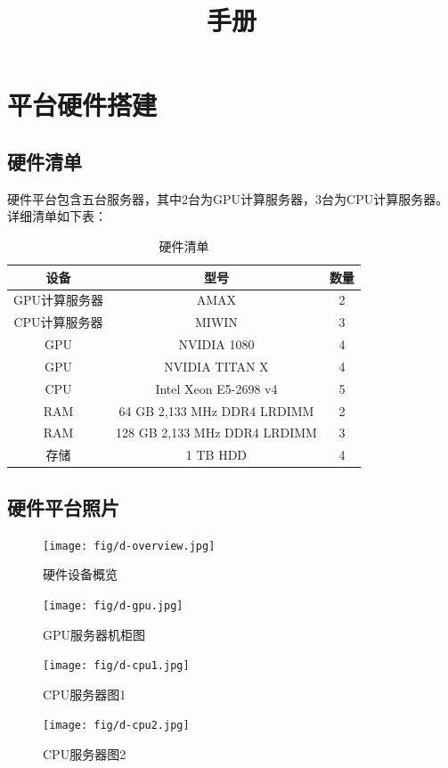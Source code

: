\documentclass{exam}
\begin{document}
\title{手册}
\maketitle
\newpage
\tableofcontents
\newpage


\section{平台硬件搭建}

\subsection{硬件清单}
硬件平台包含五台服务器，其中2台为GPU计算服务器，3台为CPU计算服务器。详细清单如下表：

\begin{table}[h]
\centering
\caption{硬件清单}
\begin{tabular}{ccc}
\hline\hline
设备&型号&数量\\\hline
GPU计算服务器&AMAX&2\\
CPU计算服务器&MIWIN&3\\
GPU&NVIDIA 1080&4\\
GPU&NVIDIA TITAN X&4\\
CPU&Intel Xeon E5-2698 v4&5\\
RAM&64 GB 2,133 MHz DDR4 LRDIMM&2\\
RAM&128 GB 2,133 MHz DDR4 LRDIMM&3\\
存储&1 TB HDD&4\\
\hline\hline
\end{tabular}
\end{table}

\subsection{硬件平台照片}
\begin{figure}
\centering
\texttt{[image: fig/d-overview.jpg]}
\caption{硬件设备概览}
\end{figure}

\begin{figure}
\centering
\texttt{[image: fig/d-gpu.jpg]}
\caption{GPU服务器机柜图}
\end{figure}

\begin{figure}
\centering
\texttt{[image: fig/d-cpu1.jpg]}
\caption{CPU服务器图1}
\end{figure}

\begin{figure}
\centering
\texttt{[image: fig/d-cpu2.jpg]}
\caption{CPU服务器图2}
\end{figure}
\end{document}

